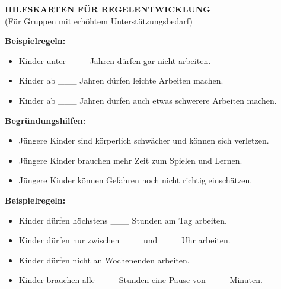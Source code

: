 \documentclass[12pt, a4paper]{article}
\newenvironment{cardbox}[1]{%
    \begin{framed}
        \noindent\colorbox{boxcolor}{\makebox[\dimexpr\linewidth-2\fboxsep\relax][c]{\textbf{\textcolor{white}{#1}}}}
        \par\vspace{0.5em}
    }{%
    \end{framed}
}
\newenvironment{hintbox}{%
    \begin{framed}
        \setlength{\fboxsep}{10pt}
        \color{black}
        \itshape
    }{%
    \end{framed}
}
\begin{document}
    \begin{center}
        \vspace{0.3cm}
        {\color{headercolor}\LARGE\textbf{HILFSKARTEN FÜR REGELENTWICKLUNG}}\\
        (Für Gruppen mit erhöhtem Unterstützungsbedarf)
    \end{center}

    \vspace{0.3cm}
    
    \begin{multicols}{2}
        \begin{cardbox}{BEREICH: ALTER}
            \textbf{Beispielregeln:}
            \begin{itemize}[leftmargin=*]
                \item Kinder unter \_\_\_ Jahren dürfen gar nicht arbeiten.
                \item Kinder ab \_\_\_ Jahren dürfen leichte Arbeiten machen.
                \item Kinder ab \_\_\_ Jahren dürfen auch etwas schwerere Arbeiten machen.
            \end{itemize}
            
            \textbf{Begründungshilfen:}
            \begin{hintbox}
            \begin{itemize}[leftmargin=*]
                \item Jüngere Kinder sind körperlich schwächer und können sich verletzen.
                \item Jüngere Kinder brauchen mehr Zeit zum Spielen und Lernen.
                \item Jüngere Kinder können Gefahren noch nicht richtig einschätzen.
            \end{itemize}
            \end{hintbox}
        \end{cardbox}

        \begin{cardbox}{BEREICH: ZEIT}
            \textbf{Beispielregeln:}
            \begin{itemize}[leftmargin=*]
                \item Kinder dürfen höchstens \_\_\_ Stunden am Tag arbeiten.
                \item Kinder dürfen nur zwischen \_\_\_ und \_\_\_ Uhr arbeiten.
                \item Kinder dürfen nicht an Wochenenden arbeiten.
                \item Kinder brauchen alle \_\_\_ Stunden eine Pause von \_\_\_ Minuten.
            \end{itemize}
            

\end{cardbox}
\end{multicols}
\end{document}
